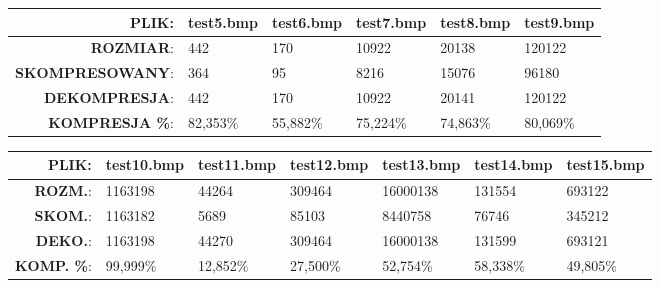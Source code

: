 \documentclass[12pt,a4paper,notitlepage]{report}
\begin{document}
\begin{table}[H]
\begin{tabular}{r|l|l|l|l|l|}\hline
\textbf{PLIK}:	&	test5.bmp	&	test6.bmp	&	test7.bmp	&	test8.bmp	&	test9.bmp	\\\hline
\textbf{ROZMIAR}:	&	442	&	170	&	10922	&	20138	&	120122	\\\hline
\textbf{SKOMPRESOWANY}:	&	364	&	95	&	8216	&	15076	&	96180	\\\hline
\textbf{DEKOMPRESJA}:	&	442	&	170	&	10922	&	20141	&	120122	\\\hline
\textbf{KOMPRESJA \%}:	&	82,353\%	&	55,882\%	&	75,224\%	&	74,863\%	&	80,069\%	\\\hline
\end{tabular}
\end{table}


\begin{table}[H]
\begin{tabular}{r|l|l|l|l|l|l|} \hline
\textbf{PLIK}:	&	test10.bmp	&	test11.bmp	&	test12.bmp	&	test13.bmp	&	test14.bmp	&	test15.bmp	\\\hline
\textbf{ROZM.}:	&	1163198	&	44264	&	309464	&	16000138	&	131554	&	693122	\\\hline
\textbf{SKOM.}:	&	1163182	&	5689	&	85103	&	8440758	&	76746	&	345212	\\\hline
\textbf{DEKO.}:	&	1163198	&	44270	&	309464	&	16000138	&	131599	&	693121	\\\hline
\textbf{KOMP. \%}:	&	99,999\%	&	12,852\%	&	27,500\%	&	52,754\%	&	58,338\%	&	49,805\%	\\\hline
\end{tabular}
\end{table}
\end{document}
